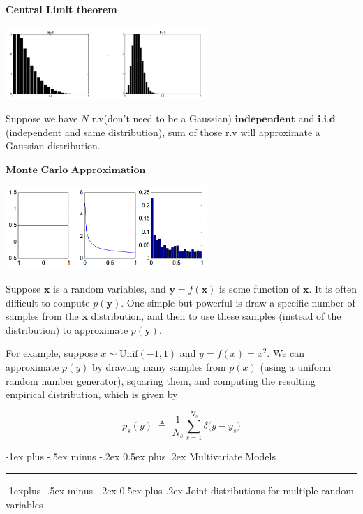\documentclass[10pt,landscape]{article}
\makeatletter
\newcommand{\inp}{\textbf{x}}
\newcommand{\out}{\textbf{y}}
\renewcommand{\section}{\@startsection{section}{1}{0mm}%
                                {-1ex plus -.5ex minus -.2ex}%
                                {0.5ex plus .2ex}%
                                {\normalfont\large\bfseries}}
\renewcommand{\subsection}{\@startsection{subsection}{2}{0mm}%
                                {-1explus -.5ex minus -.2ex}%
                                {0.5ex plus .2ex}%
                                {\normalfont\normalsize\bfseries}}
\makeatother
\begin{document}
\begin{multicols*}{3}
\textbf{Central Limit theorem}
\begin{minipage}{\linewidth}
    \centering
    \includegraphics[width=3in]{figures/CLT.PNG}
\end{minipage}
Suppose we have $N$ r.v(don't need to be a Gaussian) $\textbf{independent}$ and $\textbf{i.i.d}$(independent and same distribution), sum of those r.v will approximate a Gaussian distribution.

$\textbf{Monte Carlo Approximation}$
\begin{minipage}{\linewidth}
    \centering
    \includegraphics[width=3in]{figures/monte-carlo.PNG}
\end{minipage}

Suppose $\inp$ is a random variables, and $\out=f(\inp)$ is some function of $\inp$. It is often  difficult to compute $p(\out)$. One simple but powerful is draw a specific number of samples from the $\inp$ distribution, and then to use these samples (instead of the distribution) to approximate $p(\out)$.

For example, suppose $x \sim \mathrm{Unif}(-1,1)$ and $y = f(x) = x^2$. 
We can approximate $p(y)$ by drawing many samples from $p(x)$ 
(using a uniform random number generator), squaring them, and 
computing the resulting empirical distribution, which is given by

\begin{equation*}
p_s(y) \;\triangleq\; \frac{1}{N_s} \sum_{s=1}^{N_s} \delta\bigl(y - y_s\bigr)
\end{equation*}

\section{Multivariate Models}\smallskip \hrule height 2pt \smallskip

\subsection{Joint distributions for multiple random variables}


\end{multicols*}
\end{document}
